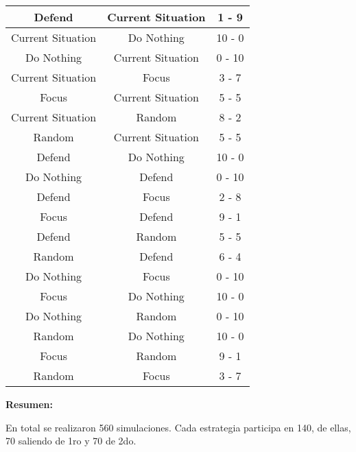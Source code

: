 \documentclass[11pt]{article}
\begin{document}
\begin{longtable}{|c|c|c|}
                \hline      Defend       & Current Situation &   1 - 9   \\
                \hline Current Situation &    Do Nothing     &  10 - 0   \\
                \hline    Do Nothing     & Current Situation &  0 - 10   \\
                \hline Current Situation &       Focus       &   3 - 7   \\
                \hline       Focus       & Current Situation &   5 - 5   \\
                \hline Current Situation &      Random       &   8 - 2   \\
                \hline      Random       & Current Situation &   5 - 5   \\
                \hline      Defend       &    Do Nothing     &  10 - 0   \\
                \hline    Do Nothing     &      Defend       &  0 - 10   \\
                \hline      Defend       &       Focus       &   2 - 8   \\
                \hline       Focus       &      Defend       &   9 - 1   \\
                \hline      Defend       &      Random       &   5 - 5   \\
                \hline      Random       &      Defend       &   6 - 4   \\
                \hline    Do Nothing     &       Focus       &  0 - 10   \\
                \hline       Focus       &    Do Nothing     &  10 - 0   \\
                \hline    Do Nothing     &      Random       &  0 - 10   \\
                \hline      Random       &    Do Nothing     &  10 - 0   \\
                \hline       Focus       &      Random       &   9 - 1   \\
                \hline      Random       &       Focus       &   3 - 7   \\
                \hline
            \end{longtable}

            \vspace{5mm}

            \textbf{Resumen:} \vspace{5mm}

            \noindent En total se realizaron 560 simulaciones. Cada estrategia participa 
            en 140, de ellas, 70 saliendo de 1ro y 70 de 2do.
\end{document}
